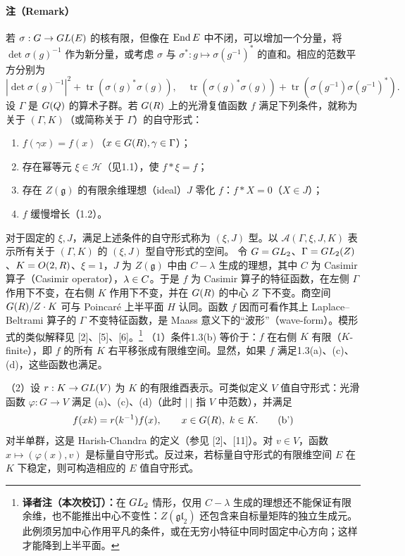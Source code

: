 \paragraph*{注（Remark）}
若 $\sigma:G\to GL(E)$ 的核有限，但像在 $\operatorname{End} E$ 中不闭，可以增加一个分量，将 $\det\sigma(g)^{-1}$ 作为新分量，或考虑 $\sigma$ 与 $\sigma^*:g\mapsto\sigma(g^{-1})^*$ 的直和。相应的范数平方分别为
\[
|\det\sigma(g)^{-1}|^2+\operatorname{tr}(\sigma(g)^*\sigma(g)),
\quad\operatorname{tr}(\sigma(g)^*\sigma(g))+\operatorname{tr}(\sigma(g^{-1})\sigma(g^{-1})^*).
\]
设 $\Gamma$ 是 $G(Q)$ 的算术子群。若 $G(R)$ 上的光滑复值函数 $f$ 满足下列条件，就称为关于 $(\Gamma,K)$（或简称关于 $\Gamma$）的自守形式：
\begin{enumerate}
\item[(a)] $f(\gamma x)=f(x)$（$x\in G(R),\gamma\in\Gamma$）；
\item[(b)] 存在幂等元 $\xi\in\mathcal H$（见1.1），使 $f*\xi=f$；
\item[(c)] 存在 $Z(\mathfrak g)$ 的有限余维理想（ideal）$J$ 零化 $f$：$f*X=0$（$X\in J$）；
\item[(d)] $f$ 缓慢增长（1.2）。
\end{enumerate}
对于固定的 $\xi,J$，满足上述条件的自守形式称为 $(\xi,J)$ 型。以 $\mathcal A(\Gamma,\xi,J,K)$ 表示所有关于 $(\Gamma,K)$ 的 $(\xi,J)$ 型自守形式的空间。
令 $G=GL_2$、$\Gamma=GL_2(Z)$、$K=O(2,R)$、$\xi=1$，$J$ 为 $Z(\mathfrak g)$ 中由 $C-\lambda$ 生成的理想，其中 $C$ 为 Casimir 算子（Casimir operator），$\lambda\in C$。于是 $f$ 为 Casimir 算子的特征函数，在左侧 $\Gamma$ 作用下不变，在右侧 $K$ 作用下不变，并在 $G(R)$ 的中心 $Z$ 下不变。商空间 $G(R)/Z\cdot K$ 可与 Poincaré 上半平面 $H$ 认同。函数 $f$ 因而可看作其上 Laplace--Beltrami 算子的 $\Gamma$ 不变特征函数，是 Maass 意义下的“波形”（wave-form）。模形式的类似解释见 [2]、[5]、[6]。\footnote{\textbf{译者注（本次校订）：}在 $GL_2$ 情形，仅用 $C-\lambda$ 生成的理想还不能保证有限余维，也不能推出中心不变性：$Z(\mathfrak{gl}_2)$ 还包含来自标量矩阵的独立生成元。此例须另加中心作用平凡的条件，或在无穷小特征中同时固定中心方向；这样才能降到上半平面。}
（1）条件1.3(b) 等价于：$f$ 在右侧 $K$ 有限（$K$-finite），即 $f$ 的所有 $K$ 右平移张成有限维空间。显然，如果 $f$ 满足1.3(a)、(c)、(d)，这些函数也满足。

（2）设 $r:K\to GL(V)$ 为 $K$ 的有限维酉表示。可类似定义 $V$ 值自守形式：光滑函数 $\varphi:G\to V$ 满足 (a)、(c)、(d)（此时 $|\ |$ 指 $V$ 中范数），并满足
\[
f(xk)=r(k^{-1})f(x),\qquad x\in G(R),\ k\in K.\tag{b'}
\]
对半单群，这是 Harish-Chandra 的定义（参见 [2]、[11]）。对 $v\in V$，函数 $x\mapsto(\varphi(x),v)$ 是标量自守形式。反过来，若标量自守形式的有限维空间 $E$ 在 $K$ 下稳定，则可构造相应的 $E$ 值自守形式。

